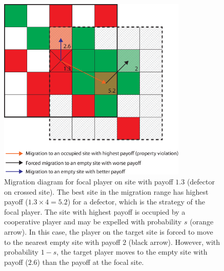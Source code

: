 \begin{figure}[h!]
\begin{center}
\centerline{\includegraphics[width=9cm]{../figures2/migration_diagram.eps}}
\caption{Migration diagram for focal player on site with payoff $1.3$ (defector on crossed site). The best site in the migration range has highest payoff ($1.3 \times 4 = 5.2$) for a defector, which is the strategy of the focal player. The site with highest payoff is occupied by a cooperative player and may be expelled with probability $s$ (orange arrow). In this case, the player on the target site is forced to move to the nearest empty site with payoff $2$ (black arrow). However, with probability $1-s$, the target player moves to the empty site with payoff ($2.6$) than the payoff at the focal site.}
\label{fig:migration_diagram}
\end{center}
\end{figure}




